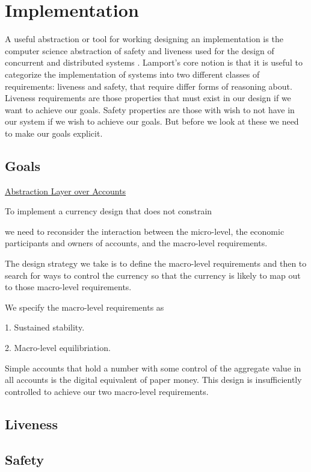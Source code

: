 \section{Implementation}
\label{section:implementation}

A useful abstraction or tool for working designing an implementation is the computer science
abstraction of safety and liveness used for the design of concurrent and distributed systems
\cite{lamport1977}. Lamport's core notion is that it is useful to categorize the implementation of
systems into two different classes of requirements: liveness and safety, that require differ forms
of reasoning about. Liveness requirements are those properties that must exist in our design if we
want to achieve our goals. Safety properties are those with wish to not have in our system if we
wish to achieve our goals. But before we look at these we need to make our goals explicit.  

\subsection{Goals}

\underline{Abstraction Layer over Accounts}

To implement a currency design that does not constrain 


we need to reconsider the interaction between the micro-level, the economic participants and owners
of accounts, and the macro-level requirements.

The design strategy we take is to define the macro-level requirements and then to search for ways to
control the currency so that the currency is likely to map out to those macro-level requirements.   

We specify the macro-level requirements as

1. Sustained stability.

2. Macro-level equilibriation.

Simple accounts that hold a number with some control of the aggregate value in all accounts is the
digital equivalent of paper money. This design is insufficiently controlled to achieve our two
macro-level requirements.   


\subsection{Liveness}


\subsection{Safety}




